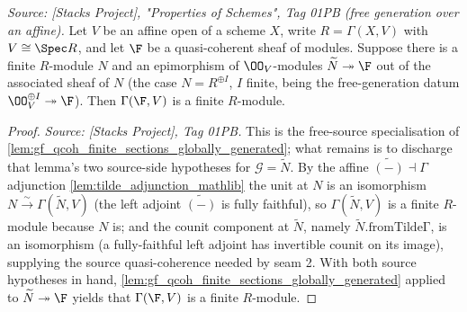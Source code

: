 \begin{lemma}
  \label{lem:gf_qcoh_sections_free_epi}
  \textit{Source: [Stacks Project], "Properties of Schemes", Tag 01PB (free generation
  over an affine).}
  Let \(V\) be an affine open of a scheme \(X\), write \(R = \Gamma(X, V)\) with
  \(V \cong \Spec R\), and let \(\F\) be a quasi-coherent sheaf of modules. Suppose there
  is a finite \(R\)-module \(N\) and an epimorphism of \(\OO_V\)-modules
  \(\widetilde{N} \twoheadrightarrow \F\) out of the associated sheaf of \(N\) (the case
  \(N = R^{\oplus I}\), \(I\) finite, being the free-generation datum
  \(\OO_V^{\oplus I} \twoheadrightarrow \F\)). Then \(\Gamma(\F, V)\) is a finite
  \(R\)-module.
\end{lemma}

\begin{proof}
  \leanok
  \textit{Source: [Stacks Project], Tag 01PB.}
  This is the free-source specialisation of
  \cref{lem:gf_qcoh_finite_sections_globally_generated}; what remains is to discharge that
  lemma's two source-side hypotheses for \(\mathcal{G} = \widetilde{N}\). By the affine
  \(\widetilde{(-)}\dashv\Gamma\) adjunction \cref{lem:tilde_adjunction_mathlib} the unit
  at \(N\) is an isomorphism \(N \xrightarrow{\sim} \Gamma(\widetilde{N}, V)\) (the left
  adjoint \(\widetilde{(-)}\) is fully faithful), so \(\Gamma(\widetilde{N}, V)\) is a
  finite \(R\)-module because \(N\) is; and the counit component at \(\widetilde{N}\),
  namely \(\widetilde{N}.\mathrm{fromTildeΓ}\), is an isomorphism (a fully-faithful left
  adjoint has invertible counit on its image), supplying the source quasi-coherence
  needed by seam 2. With both source hypotheses in hand,
  \cref{lem:gf_qcoh_finite_sections_globally_generated} applied to
  \(\widetilde{N} \twoheadrightarrow \F\) yields that \(\Gamma(\F, V)\) is a finite
  \(R\)-module.
\end{proof}

